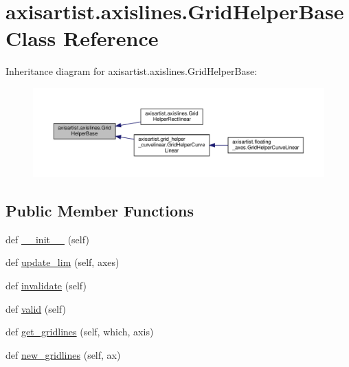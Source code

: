 \hypertarget{classaxisartist_1_1axislines_1_1GridHelperBase}{}\section{axisartist.\+axislines.\+Grid\+Helper\+Base Class Reference}
\label{classaxisartist_1_1axislines_1_1GridHelperBase}


Inheritance diagram for axisartist.\+axislines.\+Grid\+Helper\+Base\+:
\nopagebreak
\begin{figure}[H]
\begin{center}
\leavevmode
\includegraphics[width=350pt]{classaxisartist_1_1axislines_1_1GridHelperBase__inherit__graph}
\end{center}
\end{figure}
\subsection*{Public Member Functions}
\begin{DoxyCompactItemize}
\item 
def \hyperlink{classaxisartist_1_1axislines_1_1GridHelperBase_a8e4989f6758384b22f8e91b704d17d8e}{\+\_\+\+\_\+init\+\_\+\+\_\+} (self)
\item 
def \hyperlink{classaxisartist_1_1axislines_1_1GridHelperBase_aeb067c5dc7b80d1dc0bd89b831660fcb}{update\+\_\+lim} (self, axes)
\item 
def \hyperlink{classaxisartist_1_1axislines_1_1GridHelperBase_a66e58047d5378cdb2f28fb15cab61d11}{invalidate} (self)
\item 
def \hyperlink{classaxisartist_1_1axislines_1_1GridHelperBase_a31dbd9b7691c0684055f70760c316412}{valid} (self)
\item 
def \hyperlink{classaxisartist_1_1axislines_1_1GridHelperBase_a5582f5a8b44857a5167602e42760bf10}{get\+\_\+gridlines} (self, which, axis)
\item 
def \hyperlink{classaxisartist_1_1axislines_1_1GridHelperBase_a083ad83f1f1a568bae71951f6e7cf0c4}{new\+\_\+gridlines} (self, ax)
\end{DoxyCompactItemize}


